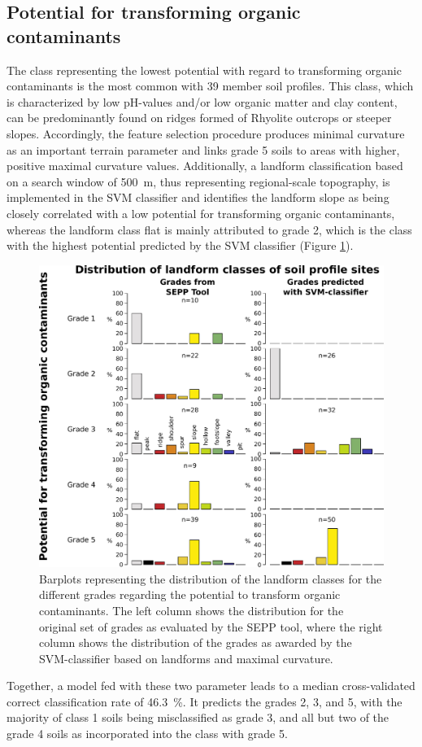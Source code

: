 \documentclass[soilsystems,article,submit,moreauthors,pdftex,10pt,a4paper]{Definitions/mdpi}
\begin{document}
\subsection{Potential for transforming organic contaminants}
The class representing the lowest potential with regard to transforming organic contaminants is the most common with 39 member soil profiles. This class, which is characterized by low pH-values and/or low organic matter and clay content, can be predominantly found on ridges formed of Rhyolite outcrops or steeper slopes. Accordingly, the feature selection procedure produces minimal curvature as an important terrain parameter and links grade 5 soils to areas with higher, positive maximal curvature values. Additionally, a landform classification based on a search window of 500~m, thus representing regional-scale topography, is implemented in the SVM classifier and identifies the landform slope as being closely correlated with a low potential for transforming organic contaminants, whereas the landform class flat is mainly attributed to grade 2, which is the class with the highest potential predicted by the SVM classifier (Figure \ref{fig:transformorganic}).
 \begin{figure}[ht!]
\includegraphics[width=\textwidth,angle=0]{landforms_transformorganic.pdf}
\caption{Barplots representing the distribution of the landform classes for the different grades regarding the potential to transform organic contaminants. The left column shows the distribution for the original set of grades as evaluated by the SEPP tool, where the right column shows the distribution of the grades as awarded by the SVM-classifier based on landforms and maximal curvature.}
\label{fig:transformorganic}
\end{figure}
Together, a model fed with these two parameter leads to a median cross-validated correct classification rate of 46.3~\%. It predicts the grades 2, 3, and 5, with the majority of class 1 soils being misclassified as grade 3, and all but two of the grade 4 soils as incorporated into the class with grade 5.
\end{document}

